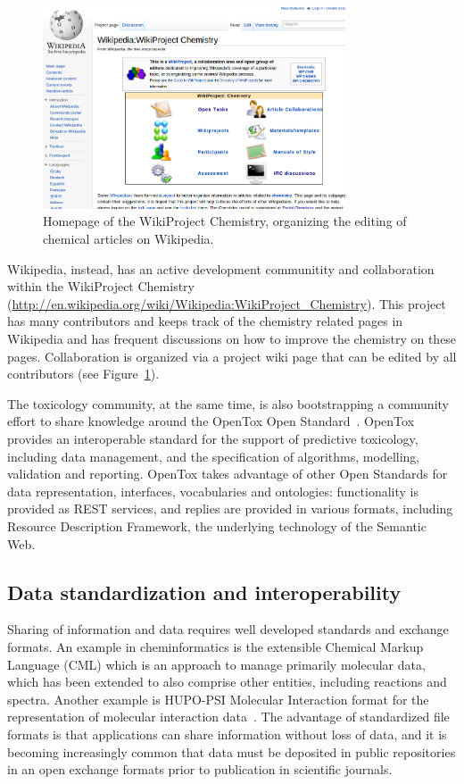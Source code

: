 \documentclass[12pt]{book}
\begin{document}
\begin{figure}
\begin{center}
\includegraphics[width=0.8\textwidth]{graphics/wikichemistry}
\end{center}
\caption{Homepage of the WikiProject Chemistry, organizing the
editing of chemical articles on Wikipedia.}
\label{fig:wikichem}
\end{figure}

Wikipedia, instead, has an active development communitity and
collaboration within the WikiProject Chemistry
(\url{http://en.wikipedia.org/wiki/Wikipedia:WikiProject_Chemistry}).
This project has many contributors and keeps track of the chemistry
related pages in Wikipedia and has frequent discussions on how
to improve the chemistry on these pages. Collaboration is organized
via a project wiki page that can be edited by all contributors
(see Figure~\ref{fig:wikichem}).

The toxicology community, at the same time, is also bootstrapping
a community effort to share knowledge around the OpenTox Open Standard~\cite{Hardy2010}.
OpenTox provides an interoperable standard for the support of predictive toxicology,
including data management, and the specification of algorithms, modelling, validation and
reporting. OpenTox takes advantage of other Open Standards for data representation,
interfaces, vocabularies and ontologies: functionality is provided as REST services,
and replies are provided in various formats, including Resource Description Framework,
the underlying technology of the Semantic Web.

\subsection{Data standardization and interoperability}

Sharing of information and data requires well developed standards and exchange formats. An example in cheminformatics is the extensible Chemical Markup Language (CML) which is an approach to manage primarily molecular data, which has been extended to also comprise other entities, including reactions and spectra. Another example is HUPO-PSI Molecular Interaction format for the representation of molecular interaction data~\cite{Orchard:2010uq}. The advantage of standardized file formats is that applications can share information without loss of data, and it is becoming increasingly common that data must be deposited in public repositories in an open exchange formats prior to publication in scientific journals.
\end{document}
